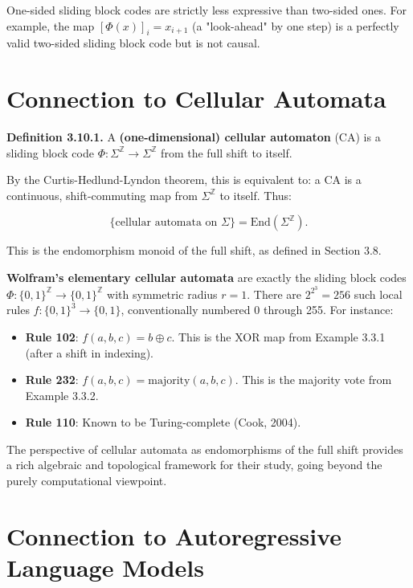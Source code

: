 \begin{remark}
One-sided sliding block codes are strictly less expressive than two-sided ones. For example, the map $[\Phi(x)]_i = x_{i+1}$ (a "look-ahead" by one step) is a perfectly valid two-sided sliding block code but is not causal.
\end{remark}



\section{Connection to Cellular Automata}

\textbf{Definition 3.10.1.} A \textbf{(one-dimensional) cellular automaton} (CA) is a sliding block code $\Phi: \Sigma^\mathbb{Z} \to \Sigma^\mathbb{Z}$ from the full shift to itself.

By the Curtis-Hedlund-Lyndon theorem, this is equivalent to: a CA is a continuous, shift-commuting map from $\Sigma^\mathbb{Z}$ to itself. Thus:

\[\{ \text{cellular automata on } \Sigma\}  = \text{End}(\Sigma^\mathbb{Z}).\]

This is the endomorphism monoid of the full shift, as defined in Section 3.8.

\textbf{Wolfram's elementary cellular automata} are exactly the sliding block codes $\Phi: \{ 0,1\} ^\mathbb{Z} \to \{ 0,1\} ^\mathbb{Z}$ with symmetric radius $r = 1$. There are $2^{2^3} = 256$ such local rules $f: \{ 0,1\} ^3 \to \{ 0,1\} $, conventionally numbered 0 through 255. For instance:

\begin{itemize}
\item \textbf{Rule 102}: $f(a,b,c) = b \oplus c$. This is the XOR map from Example 3.3.1 (after a shift in indexing).
\item \textbf{Rule 232}: $f(a,b,c) = \text{majority}(a,b,c)$. This is the majority vote from Example 3.3.2.
\item \textbf{Rule 110}: Known to be Turing-complete (Cook, 2004).
\end{itemize}

The perspective of cellular automata as endomorphisms of the full shift provides a rich algebraic and topological framework for their study, going beyond the purely computational viewpoint.



\section{Connection to Autoregressive Language Models}


